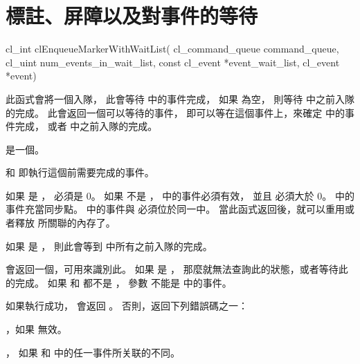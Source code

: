 \section{標註、屏障以及對事件的等待}


\startCLFUNC
cl_int clEnqueueMarkerWithWaitList(
			cl_command_queue command_queue,
			cl_uint num_events_in_wait_list,
			const cl_event *event_wait_list,
			cl_event *event)
\stopCLFUNC

此函式會將一個入隊，
此會等待  中的事件完成，
如果  為空，
則等待  中之前入隊的完成。
此會返回一個可以等待的事件，
即可以等在這個事件上，來確定  中的事件完成，
或者  中之前入隊的完成。

 是一個。

 和 
 即執行這個前需要完成的事件。

如果  是 ，
 必須是 0。
如果  不是 ，
 中的事件必須有效，
並且  必須大於 0。
 中的事件充當同步點。
 中的事件與  必須位於同一中。
當此函式返回後，就可以重用或者釋放  所關聯的內存了。

如果  是 ，
則此會等到  中所有之前入隊的完成。

 會返回一個，可用來識別此。
如果  是 ，
那麼就無法查詢此的狀態，或者等待此的完成。
如果  和  都不是 ，
參數  不能是  中的事件。

如果執行成功，  會返回 。
否則，返回下列錯誤碼之一：
\startigBase
\item {}，如果  無效。

\item {}，
如果  和  中的任一事件所关联的不同。

